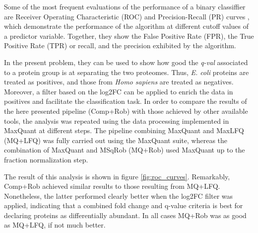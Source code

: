 \documentclass[11pt, a4paper]{report}
\begin{document}
Some of the most frequent evaluations of the performance of a binary classiffier are Receiver Operating Characteristic (ROC) and Precision-Recall (PR) curves \cite{Bradley1997}, which demonstrate the performance of the algorithm at different cutoff values of a predictor variable. Together, they show the False Positive Rate (FPR), the True Positive Rate (TPR) or recall, and the precision exhibited by the algorithm.




In the present problem, they can be used to show how good the \textit{q-val} associated to a protein group is at separating the two proteomes. Thus, \textit{E. coli} proteins are treated as positives, and those from \textit{Homo sapiens} are treated as negatives. Moreover, a filter based on the \ac{log2FC} can be applied to enrich the data in positives and facilitate the classification task.
In order to compare the results of the here presented pipeline (Comp+Rob) with those achieved by other available tools, the analysis was repeated using the data processing implemented in MaxQuant \cite{Cox2008} at different steps. The pipeline combining MaxQuant and MaxLFQ (MQ+LFQ) was fully carried out using the MaxQuant suite, whereas the combination of MaxQuant and MSqRob (MQ+Rob) used MaxQuant up to the fraction normalization step.

The result of this analysis is shown in figure \ref{fig:roc_curves}. Remarkably, Comp+Rob achieved similar results to those resulting from MQ+LFQ. Nonetheless, the latter performed clearly better when the \ac{log2FC} filter was applied, indicating that a combined fold change and q-value criteria is best for declaring proteins as differentially abundant. In all cases MQ+Rob was as good as MQ+LFQ, if not much better.
\end{document}

